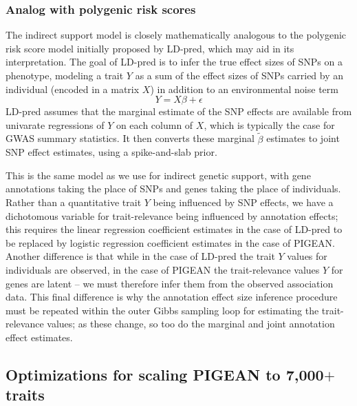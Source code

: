 \documentclass[11pt]{article}
\begin{document}
\subsubsection{Analog with polygenic risk scores}
The indirect support model is closely mathematically analogous to the
polygenic risk score model initially proposed by
LD-pred\cite{analogous}, which may aid in its interpretation. The goal
of LD-pred is to infer the true effect sizes of SNPs on a phenotype,
modeling a trait $Y$ as a sum of the effect sizes of SNPs carried by
an individual (encoded in a matrix $X$) in addition to an environmental noise term
\[Y = X\beta + \epsilon\]
LD-pred assumes that the marginal estimate of the SNP effects are
available from univarate regressions of $Y$ on each column of $X$,
which is typically the case for GWAS summary statistics. It then
converts these marginal $\tilde{\beta}$ estimates to joint SNP effect
estimates, using a spike-and-slab prior.

This is the same model as we use for indirect genetic support, with
gene annotations taking the place of SNPs and genes taking the place
of individuals. Rather than a quantitative
trait $Y$ being influenced by SNP effects, we have a dichotomous
variable for trait-relevance being influenced by annotation effects;
this requires the linear regression coefficient estimates in the case
of LD-pred to be replaced by logistic regression coefficient estimates
in the case of PIGEAN. Another difference is that while in the case of
LD-pred the trait $Y$ values for individuals are observed, in the case
of PIGEAN the trait-relevance values $Y$ for genes are latent -- we
must therefore infer them from the observed association data. This
final difference is why the annotation effect size inference procedure
must be repeated within the outer Gibbs sampling loop for estimating
the trait-relevance values; as these change, so too do the marginal
and joint annotation effect estimates.

\subsection{Optimizations for scaling PIGEAN to 7,000$+$ traits}
\end{document}
